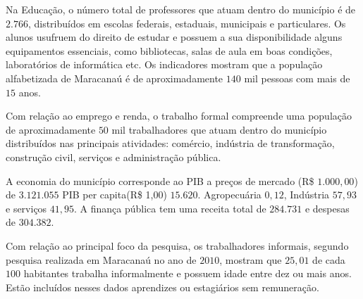Na Educação, o número total de professores que atuam dentro do município é de $2.766$, distribuídos em escolas federais, estaduais, municipais e particulares. Os alunos usufruem do direito de estudar e possuem a sua disponibilidade alguns equipamentos essenciais, como bibliotecas, salas de aula em boas condições, laboratórios de informática etc. Os indicadores mostram que a população alfabetizada de Maracanaú é de aproximadamente $140$ mil pessoas com mais de $15$ anos.

Com relação ao emprego e renda, o trabalho formal compreende uma população de aproximadamente $50$ mil trabalhadores que atuam dentro do município distribuídos nas principais atividades: comércio, indústria de transformação, construção civil, serviços e administração pública.

A economia do município corresponde ao PIB a preços de mercado (R\$ $1.000,00$) de $3.121.055$ PIB per capita(R\$ 1,00) $15.620$. Agropecuária $0,12$, Indústria $57,93$ e serviços $41,95$. A finança pública tem uma receita total de $284.731$ e despesas de $304.382$.

Com relação ao principal foco da pesquisa, os trabalhadores informais, segundo pesquisa realizada em Maracanaú no ano de $2010$,  mostram que $25,01$ de cada $100$ habitantes trabalha informalmente e possuem idade entre dez ou mais anos. Estão incluídos nesses dados aprendizes ou estagiários sem remuneração.